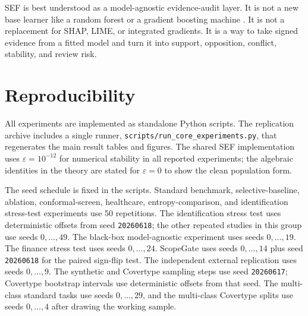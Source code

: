 \documentclass[11pt]{article}
\begin{document}
SEF is best understood as a model-agnostic evidence-audit layer. It is not a new base learner like a random forest or a gradient boosting machine \citep{breiman2001random,friedman2001greedy}. It is not a replacement for SHAP, LIME, or integrated gradients. It is a way to take signed evidence from a fitted model and turn it into support, opposition, conflict, stability, and review risk.

\section{Reproducibility}

All experiments are implemented as standalone Python scripts. The replication archive includes a single runner, \texttt{scripts/run\_core\_experiments.py}, that regenerates the main result tables and figures. The shared SEF implementation uses $\varepsilon=10^{-12}$ for numerical stability in all reported experiments; the algebraic identities in the theory are stated for $\varepsilon=0$ to show the clean population form.

The seed schedule is fixed in the scripts. Standard benchmark, selective-baseline, ablation, conformal-screen, healthcare, entropy-comparison, and identification stress-test experiments use 50 repetitions. The identification stress test uses deterministic offsets from seed \texttt{20260618}; the other repeated studies in this group use seeds $0,\ldots,49$. The black-box model-agnostic experiment uses seeds $0,\ldots,19$. The finance stress test uses seeds $0,\ldots,24$. ScopeGate uses seeds $0,\ldots,14$ plus seed \texttt{20260618} for the paired sign-flip test. The independent external replication uses seeds $0,\ldots,9$. The synthetic and Covertype sampling steps use seed \texttt{20260617}; Covertype bootstrap intervals use deterministic offsets from that seed. The multi-class standard tasks use seeds $0,\ldots,29$, and the multi-class Covertype splits use seeds $0,\ldots,4$ after drawing the working sample.

\begin{table}[!htbp]
\centering
\caption{Public data sources and identifiers used in the experiments.}
\label{tab:data-sources}
\end{table}
\end{document}
